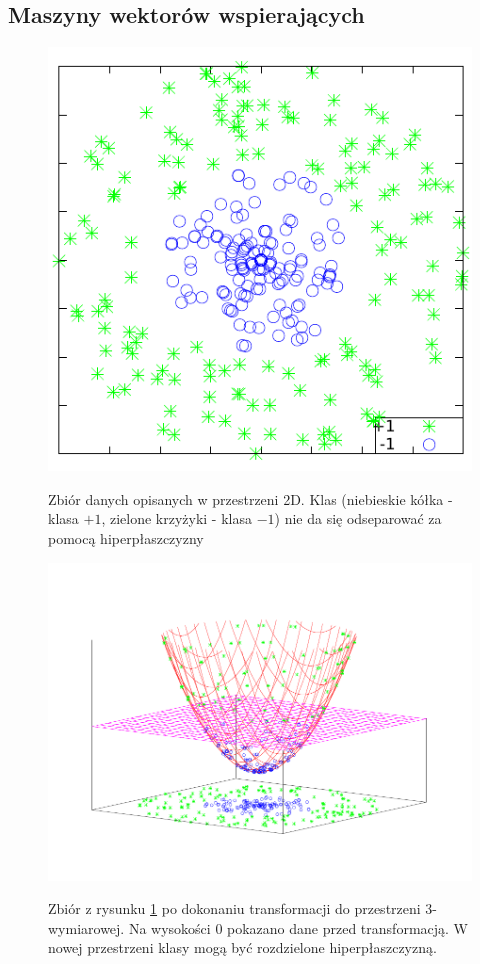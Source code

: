 \subsection{Maszyny wektorów wspierających}


\begin{figure}[h]
\centering
\includegraphics[scale=1]{figures/functions/2-nonlinear}
\label{fig:nonlinear}
\caption{Zbiór danych opisanych w przestrzeni 2D. Klas (niebieskie kółka - klasa $+1$, zielone krzyżyki - klasa $-1$) nie da się odseparować za pomocą hiperpłaszczyzny}
\end{figure}

\begin{figure}[h]
\centering
\includegraphics[scale=0.8]{figures/functions/2-transform}
\label{fig:transform}
\caption{Zbiór z rysunku \ref{fig:nonlinear} po dokonaniu transformacji do przestrzeni 3-wymiarowej. Na wysokości 0 pokazano dane przed transformacją. W nowej przestrzeni klasy mogą być rozdzielone hiperpłaszczyzną.}
\end{figure}

